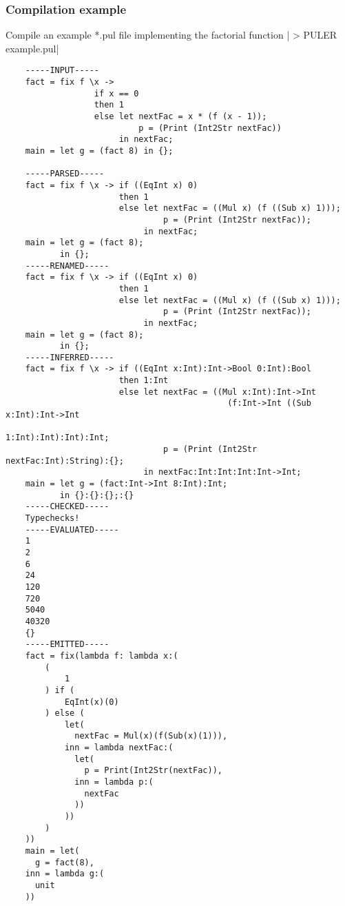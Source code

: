 \documentclass{article} %
\begin{document}
\subsubsection{Compilation example}
Compile an example *.pul file implementing the factorial function
|    > PULER example.pul|
\begin{verbatim}
    -----INPUT-----
    fact = fix f \x ->
                  if x == 0
                  then 1
                  else let nextFac = x * (f (x - 1));
                           p = (Print (Int2Str nextFac))
                       in nextFac;
    main = let g = (fact 8) in {};
    
    -----PARSED-----
    fact = fix f \x -> if ((EqInt x) 0)
                       then 1
                       else let nextFac = ((Mul x) (f ((Sub x) 1)));
                                p = (Print (Int2Str nextFac));
                            in nextFac;
    main = let g = (fact 8);
           in {};
    -----RENAMED-----
    fact = fix f \x -> if ((EqInt x) 0)
                       then 1
                       else let nextFac = ((Mul x) (f ((Sub x) 1)));
                                p = (Print (Int2Str nextFac));
                            in nextFac;
    main = let g = (fact 8);
           in {};
    -----INFERRED-----
    fact = fix f \x -> if ((EqInt x:Int):Int->Bool 0:Int):Bool
                       then 1:Int
                       else let nextFac = ((Mul x:Int):Int->Int
                                             (f:Int->Int ((Sub x:Int):Int->Int
                                                            1:Int):Int):Int):Int;
                                p = (Print (Int2Str nextFac:Int):String):{};
                            in nextFac:Int:Int:Int:Int->Int;
    main = let g = (fact:Int->Int 8:Int):Int;
           in {}:{}:{};:{}
    -----CHECKED-----
    Typechecks!
    -----EVALUATED-----
    1
    2
    6
    24
    120
    720
    5040
    40320
    {}
    -----EMITTED-----
    fact = fix(lambda f: lambda x:(
        (
            1
        ) if (
            EqInt(x)(0)
        ) else (
            let(
              nextFac = Mul(x)(f(Sub(x)(1))),
            inn = lambda nextFac:(
              let(
                p = Print(Int2Str(nextFac)),
              inn = lambda p:(
                nextFac
              ))
            ))
        )
    ))
    main = let(
      g = fact(8),
    inn = lambda g:(
      unit
    ))
\end{verbatim}
\end{document}
